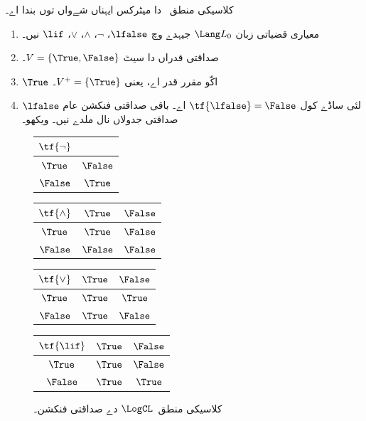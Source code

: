 \documentclass[../../../include/open-logic-section]{subfiles}
\begin{document}
\begin{ex}
کلاسیکی منطق~\LogCL{} دا میٹرکس ایہناں شےواں توں بندا اے۔
\begin{enumerate}
  \item معیاری قضیاتی زبان $\Lang L_0$ جیہدے وچ
  $\lfalse$، $\lnot$، $\land$، $\lor$، $\lif$ نیں۔
  \item صداقتی قدراں دا سیٹ $V = \{\True, \False\}$۔
  \item $\True$ اکّو مقرر قدر اے، یعنی $V^+ = \{\True\}$۔
  \item $\lfalse$ لئی ساڈے کول $\tf{\lfalse} = \False$ اے۔
  باقی صداقتی فنکشن عام صداقتی جدولاں نال ملدے نیں۔
   ویکھو۔
\end{enumerate}
\begin{figure}
  \begin{center}
      \begin{tabular}{c|c}
        $\tf{\lnot}$ & \\
        \hline
        $\True$ & $\False$ \\
        $\False$ & $\True$
      \end{tabular}
      \quad
      \begin{tabular}{c|cc}
        $\tf{\land}$ & $\True$ & $\False$ \\
        \hline
        $\True$ & $\True$ & $\False$ \\
        $\False$ & $\False$ & $\False$
      \end{tabular}
      \quad
      \begin{tabular}{c|cc}
        $\tf{\lor}$ & $\True$ & $\False$ \\
        \hline
        $\True$ & $\True$ & $\True$ \\
        $\False$ & $\True$ & $\False$
      \end{tabular}
      \quad
      \begin{tabular}{c|cc}
        $\tf{\lif}$ & $\True$ & $\False$ \\
        \hline
        $\True$ & $\True$ & $\False$ \\
        $\False$ & $\True$ & $\True$
      \end{tabular}
    \end{center}
    \caption{کلاسیکی منطق~$\LogCL$ دے صداقتی فنکشن۔}
  \end{figure}
  \end{ex}
\end{document}
